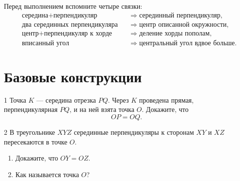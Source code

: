 
\studentnameblock

\begin{routebox}
Перед выполнением вспомните четыре связки:
\[
\begin{aligned}
&\text{середина}+\text{перпендикуляр}
&&\Longrightarrow \text{серединный перпендикуляр},\\
&\text{два серединных перпендикуляра}
&&\Longrightarrow \text{центр описанной окружности},\\
&\text{центр}+\text{перпендикуляр к хорде}
&&\Longrightarrow \text{деление хорды пополам},\\
&\text{вписанный угол}
&&\Longrightarrow \text{центральный угол вдвое больше}.
\end{aligned}
\]
\end{routebox}



\section{Базовые конструкции}

\begin{homeworktask}{1}
Точка \(K\) — середина отрезка \(PQ\). Через \(K\) проведена прямая,
перпендикулярная \(PQ\), и на ней взята точка \(O\). Докажите, что
\[
OP=OQ.
\]
\noindent
\begin{minipage}[t]{0.43\linewidth}
\drawingbox[36mm]
\end{minipage}\hfill
\begin{minipage}[t]{0.53\linewidth}
\answerline[2]
\end{minipage}
\end{homeworktask}

\begin{homeworktask}{2}
В треугольнике \(XYZ\) серединные перпендикуляры к сторонам \(XY\) и
\(XZ\) пересекаются в точке \(O\).

\begin{enumerate}
  \item Докажите, что \(OY=OZ\).
  \item Как называется точка \(O\)?
\end{enumerate}
\noindent
\begin{minipage}[t]{0.43\linewidth}
\drawingbox[36mm]
\end{minipage}\hfill
\begin{minipage}[t]{0.53\linewidth}
\answerline[3]
\end{minipage}
\end{homeworktask}


